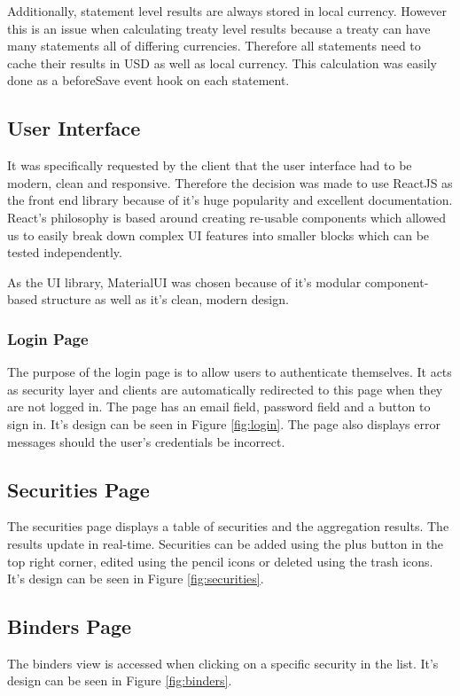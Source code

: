 \documentclass[12pt]{article}
\begin{document}
Additionally, statement level results are always stored in local currency. However this is an issue when calculating treaty level results because a treaty can have many statements all of differing currencies. Therefore all statements need to cache their results in USD as well as local currency. This calculation was easily done as a beforeSave event hook on each statement.

\subsection{User Interface}
It was specifically requested by the client that the user interface had to be modern, clean and responsive. Therefore the decision was made to use ReactJS \cite{react} as the front end library because of it's huge popularity and excellent documentation. React's philosophy is based around creating re-usable components which allowed us to easily break down complex UI features into smaller blocks which can be tested independently.

As the UI library, MaterialUI \cite{material_ui} was chosen because of it's modular component-based structure as well as it's clean, modern design.

\subsubsection{Login Page}
The purpose of the login page is to allow users to authenticate themselves. It acts as security layer and clients are automatically redirected to this page when they are not logged in. The page has an email field, password field and a button to sign in. It's design can be seen in Figure \ref{fig:login}. The page also displays error messages should the user's credentials be incorrect.

\subsection{Securities Page}
The securities page displays a table of securities and the aggregation results. The results update in real-time. Securities can be added using the plus button in the top right corner, edited using the pencil icons or deleted using the trash icons. It's design can be seen in Figure \ref{fig:securities}.

\subsection{Binders Page}
The binders view is accessed when clicking on a specific security in the list. It's design can be seen in Figure \ref{fig:binders}.
\end{document}
